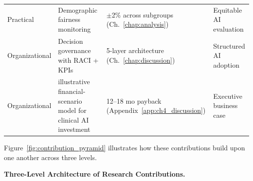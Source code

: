 \begin{table}[!htbp]
\begin{tabularx}{\textwidth}{@{} >{\raggedright\arraybackslash}p{1.5cm} L L >{\raggedright\arraybackslash}p{1.8cm} @{}}
\addlinespace
Practical & Demographic fairness monitoring & $\pm$2\% across subgroups (Ch.~\ref{chap:analysis}) & Equitable AI evaluation \\
\addlinespace
Organizational & Decision governance with RACI + KPIs & 5-layer architecture (Ch.~\ref{chap:discussion}) & Structured AI adoption \\
\addlinespace
Organizational & illustrative financial-scenario model for clinical AI investment & 12--18 mo payback (Appendix~\ref{app:ch4_discussion}) & Executive business case \\
\bottomrule
\end{tabularx}
\end{table}

Figure~\ref{fig:contribution_pyramid} illustrates how these contributions build upon one another across three levels.

\noindent\textbf{Three-Level Architecture of Research Contributions.}

